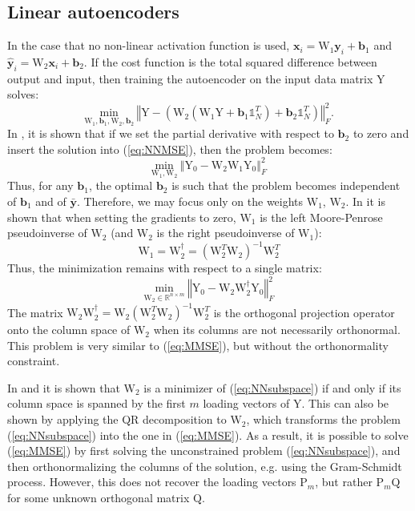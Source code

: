 \subsection{Linear autoencoders}
In the case that no non-linear activation function is used, $\textbf{x}_i = \text{W}_1 \textbf{y}_i + \textbf{b}_1$ and $\hat{\textbf{y}}_i = \text{W}_2 \textbf{x}_i + \textbf{b}_2$. If the cost function is the total squared difference between output and input, then training the autoencoder on the input data matrix $\text{Y}$ solves:
\begin{equation}
\underset{\text{W}_1, \textbf{b}_1, \text{W}_2, \textbf{b}_2 }{\text{min}}{~
\left\Vert \text{Y} - \left(
\text{W}_2 \left(\text{W}_1 \text{Y} + \textbf{b}_1 \mathbb{1}_N^T \right) + \textbf{b}_2 \mathbb{1}_N^T
\right) \right\Vert_F^2 }.
\label{eq:NNMSE}
\end{equation}
In \cite{AutoencoderSVD}, it is shown that if we set the partial derivative with respect to $\textbf{b}_2$ to zero and insert the solution into (\ref{eq:NNMSE}), then the problem becomes:
\[
\underset{\text{W}_1, \text{W}_2 }{\text{min}}{~\left\Vert \text{Y}_0 - \text{W}_2 \text{W}_1 \text{Y}_0 \right\Vert_F^2}
\]
Thus, for any $\textbf{b}_1$, the optimal $\textbf{b}_2$ is such that the problem becomes independent of $\textbf{b}_1$ and of $\bar{\textbf{y}}$. Therefore, we may focus only on the weights $\text{W}_1$, $\text{W}_2$. In \cite{WithoutLocalMinima} it is shown that when setting the gradients to zero, $\text{W}_1$ is the left Moore-Penrose pseudoinverse of $\text{W}_2$ (and $\text{W}_2$ is the right pseudoinverse of $\text{W}_1$):
\[
\text{W}_1 = \text{W}_2^{\dagger} = \left( \text{W}_2^T \text{W}_2 \right)^{-1} \text{W}_2^T
\]
Thus, the minimization remains with respect to a single matrix:
\begin{equation}
\underset{\text{W}_2 \in \mathbb{R}^{n \times m}}{\text{min}}{~\left\Vert \text{Y}_0 - \text{W}_2 \text{W}_2^{\dagger} \text{Y}_0 \right\Vert_F^2}
\label{eq:NNsubspace}
\end{equation}
The matrix $\text{W}_2 \text{W}_2^{\dagger} = \text{W}_2 \left( \text{W}_2^T \text{W}_2 \right)^{-1} \text{W}_2^T$ is the orthogonal projection operator onto the column space of $\text{W}_2$ when its columns are not necessarily orthonormal. This problem is very similar to (\ref{eq:MMSE}), but without the orthonormality constraint.

In \cite{AutoencoderSVD} and \cite{WithoutLocalMinima} it is shown that $\text{W}_2$ is a minimizer of (\ref{eq:NNsubspace}) if and only if its column space is spanned by the first $m$ loading vectors of $\text{Y}$. This can also be shown by applying the QR decomposition to $\text{W}_2$, which transforms the problem (\ref{eq:NNsubspace}) into the one in (\ref{eq:MMSE}). As a result, it is possible to solve (\ref{eq:MMSE}) by first solving the unconstrained problem (\ref{eq:NNsubspace}), and then orthonormalizing the columns of the solution, e.g. using the Gram-Schmidt process. However, this does not recover the loading vectors $\text{P}_m$, but rather $\text{P}_m \text{Q}$ for some unknown orthogonal matrix $\text{Q}$.

